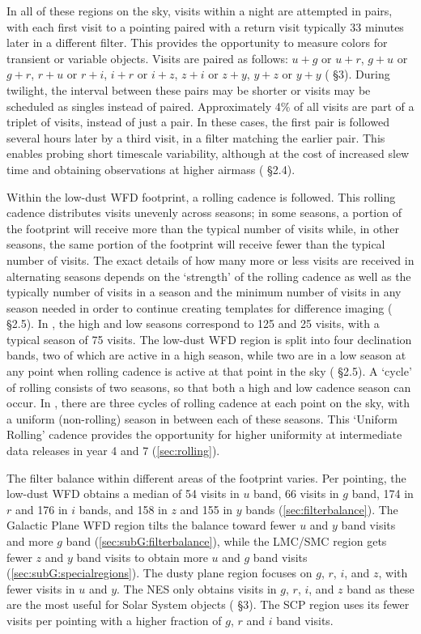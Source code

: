 In all of these regions on the sky, visits within a night are attempted in pairs, with each first visit to a pointing paired with a return visit typically 33 minutes later in a different filter. This provides the opportunity to measure colors for transient or variable objects. Visits are paired as follows: $u+g$ or $u+r$, $g+u$ or $g+r$, $r+u$ or $r+i$, $i+r$ or $i+z$, $z+i$ or $z+y$, $y+z$ or $y+y$ ( \S3).  During twilight, the interval between these pairs may be shorter or visits may be scheduled as singles instead of paired. Approximately 4\% of all visits are part of a triplet of visits, instead of just a pair. In these cases, the first pair is followed several hours later by a third visit, in a filter matching the earlier pair. This enables probing short timescale variability, although at the cost of increased slew time and obtaining observations at higher airmass ( \S2.4). 

Within the low-dust WFD footprint, a rolling cadence is followed. This rolling cadence distributes visits unevenly across seasons; in some seasons, a portion of the footprint will receive more than the typical number of visits while, in other seasons, the same portion of the footprint will receive fewer than the typical number of visits. The exact details of how many more or less visits are received in alternating seasons depends on the `strength' of the rolling cadence as well as the typically number of visits in a season and the minimum number of visits in any season needed in order to continue creating templates for difference imaging ( \S2.5). In , the high and low seasons correspond to 125 and 25 visits, with a typical season of 75 visits. The low-dust WFD region is split into four declination bands, two of which are active in a high season, while two are in a low season at any point when rolling cadence is active at that point in the sky ( \S2.5). A `cycle' of rolling consists of two seasons, so that both a high and low cadence season can occur. In , there are three cycles of rolling cadence at each point on the sky, with a uniform (non-rolling) season in between each of these seasons. This `Uniform Rolling' cadence provides the opportunity for higher uniformity at intermediate data releases in year 4 and 7 (\autoref{sec:rolling}). 

The filter balance within different areas of the footprint varies. Per pointing, the low-dust WFD obtains a median of 54 visits in $u$ band, 66 visits in $g$ band, 174 in $r$ and 176 in $i$ bands, and 158 in $z$ and 155 in $y$ bands (\autoref{sec:filterbalance}). The Galactic Plane WFD region tilts the balance toward fewer $u$ and $y$ band visits and more $g$ band (\autoref{sec:subG:filterbalance}), while the LMC/SMC region gets fewer $z$ and $y$ band visits to obtain more $u$ and $g$ band visits (\autoref{sec:subG:specialregions}). The dusty plane region focuses on $g$, $r$, $i$, and $z$, with fewer visits in $u$ and $y$. The NES only obtains visits in $g$, $r$, $i$, and $z$ band as these are the most useful for Solar System objects ( \S3). The SCP region uses its fewer visits per pointing with a higher fraction of $g$, $r$ and $i$ band visits.

